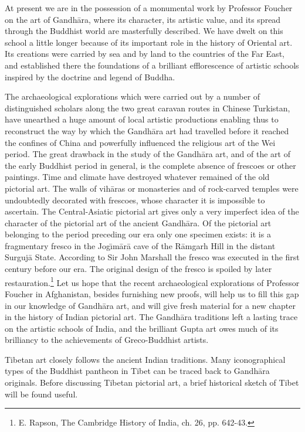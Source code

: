 \documentclass[a4paper, 12pt, oneside]{article}
\begin{document}
At present we are in the possession of a monumental work by Professor Foucher on the art of Gandh\={a}ra, where its character, its artistic value, and its spread through the Buddhist world are masterfully described. We have dwelt on this school a little longer because of its important role in the history of Oriental art. Its creations were carried by sea and by land to the countries of the Far East, and established there the foundations of a brilliant efflorescence of artistic schools inspired by the doctrine and legend of Buddha.

The archaeological explorations which were carried out by a number of distinguished scholars along the two great caravan routes in Chinese Turkistan, have unearthed a huge amount of local artistic productions enabling thus to reconstruct the way by which the Gandh\={a}ra art had travelled before it reached the confines of China and powerfully influenced the religious art of the Wei period. The great drawback in the study of the Gandh\={a}ra art, and of the art of the early Buddhist period in general, is the complete absence of frescoes or other paintings. Time and climate have destroyed whatever remained of the old pictorial art. The walls of vih\={a}ras or monasteries and of rock-carved temples were undoubtedly decorated with frescoes, whose character it is impossible to ascertain. The Central-Asiatic pictorial art gives only a very imperfect idea of the character of the pictorial art of the ancient Gandh\={a}ra. Of the pictorial art belonging to the period preceding our era only one specimen exists: it is a fragmentary fresco in the Jog\={\i}m\={a}r\={a} cave of the R\={a}mgarh Hill in the distant Surguj\={a} State. According to Sir John Marshall the fresco was executed in the first century before our era. The original design of the fresco is spoiled by later restauration.\footnote{E. Rapson, The Cambridge History of India, ch. 26, pp. 642-43.} Let us hope that the recent archaeological explorations of Professor Foucher in Afghanistan, besides furnishing new proofs, will help us to fill this gap in our knowledge of Gandh\={a}ra art, and will give fresh material for a new chapter in the history of Indian pictorial art. The Gandh\={a}ra traditions left a lasting trace on the artistic schools of India, and the brilliant Gupta art owes much of its brilliancy to the achievements of Greco-Buddhist artists.

Tibetan art closely follows the ancient Indian traditions. Many iconographical types of the Buddhist pantheon in Tibet can be traced back to Gandh\={a}ra originals. Before discussing Tibetan pictorial art, a brief historical sketch of Tibet will be found useful.
\end{document}
